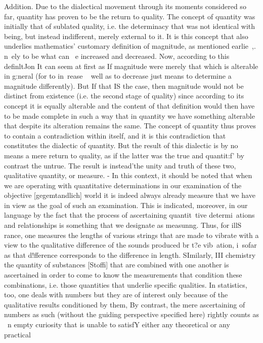 {{Addition. Due to the dialectical movement through its moments considered so far, quantity has proven to be the return to quality. The concept of quantity
was initially that of sublated quality, i.e. the determinacy that was not identical
with being, but instead indifferent, merely external to it. It is this concept that
also underlies mathematics' customary definition of magnitude, as mentioned
earlie~,. n~ely to be what can ~e increased and decreased. Now, according to this
definltJon It can seem at first as If magnitude were merely that which is alterable in
g:neral (for to in~rease ~ well as to decrease just means to determine a magnitude
differently). But If that IS the case, then magnitude would not be distinct from
existence (i.e. the second stage of quality) since according to its concept it is equally
alterable and the content of that definition would then have to be made complete
in such a way that in quantity we have something alterable that despite its alteration
remains the same. The concept of quantity thus proves to contain a contradiction
within itself, and it is this contradiction that constitutes the dialectic of quantity.
But the result of this dialectic is by no means a mere return to quality, as if the
latter was the true and quantit:f' by contrast the untrue. The result is instead'the
unity and truth of these two, qualitative quantity, or measure. - In this context,
it should be noted that when we are operating with quantitative determinations
in our examination of the objective [gegemtandlich] world it is indeed always
already measure that we have in view as the goal of such an examination. This is
indicated, moreover, in our language by the fact that the process of ascertaining
quantit~tive determi~ations and relationships is something that we designate as
measunng. Thus, for illS rance, one measures the lengths of various strings that are
made to vibrate with a view to the qualitative difference of the sounds produced
br t?e vib~ation, i~sofar as that d!fference corresponds to the difference in length.
SImilarly, III chemistry the quantity of substances [Stoffi] that are combined with
one another is ascertained in order to come to know the measurements that
condition these combinations, i.e. those quantities that underlie specific qualities.
In statistics, too, one deals with numbers but they are of interest only because of
the qualitative results conditioned by them, By contrast, the mere ascertaining of
numbers as such (without the guiding perspective specified here) rightly counts as
~n empty curiosity that is unable to satisfY either any theoretical or any practical
}}
